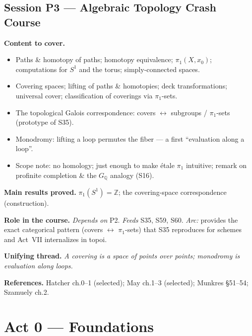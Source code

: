 \documentclass[11pt,a4paper]{article}
\newcommand{\sess}[2]{\subsection[#1. #2]{Session #1 --- #2}}
\newcommand{\chead}{\par\smallskip\noindent\textbf{Content to cover.}}
\newcommand{\proved}[1]{\par\smallskip\noindent\textbf{Main results proved.} #1}
\newcommand{\role}[1]{\par\smallskip\noindent\textbf{Role in the course.} #1}
\newcommand{\thread}[1]{\par\smallskip\noindent\textbf{Unifying thread.} \textit{#1}}
\newcommand{\srefs}[1]{\par\smallskip\noindent\textbf{References.} #1}
\newcommand{\Z}{\mathbb{Z}}
\newcommand{\Q}{\mathbb{Q}}
\begin{document}
	\sess{P3}{Algebraic Topology Crash Course}
	\chead
	\begin{itemize}
		\item Paths \& homotopy of paths; homotopy equivalence; $\pi_1(X,x_0)$; computations for $S^1$ and the torus; simply-connected spaces.
		\item Covering spaces; lifting of paths \& homotopies; deck transformations; universal cover; classification of coverings via $\pi_1$-sets.
		\item The topological Galois correspondence: covers $\leftrightarrow$ subgroups / $\pi_1$-sets (prototype of S35).
		\item Monodromy: lifting a loop permutes the fiber --- a first ``evaluation along a loop''.
		\item Scope note: no homology; just enough to make \'etale $\pi_1$ intuitive; remark on profinite completion \& the $G_\Q$ analogy (S16).
	\end{itemize}
	\proved{$\pi_1(S^1)=\Z$; the covering-space correspondence (construction).}
	\role{\emph{Depends on} P2. \emph{Feeds} S35, S59, S60. \emph{Arc:} provides the exact categorical pattern (covers $\leftrightarrow$ $\pi_1$-sets) that S35 reproduces for schemes and Act~VII internalizes in topoi.}
	\thread{A covering is a space of points over points; monodromy is evaluation along loops.}
	\srefs{Hatcher ch.0--1 (selected); May ch.1--3 (selected); Munkres \S51--54; Szamuely ch.2.}
	
	\section{Act 0 --- Foundations}
	
\end{document}
